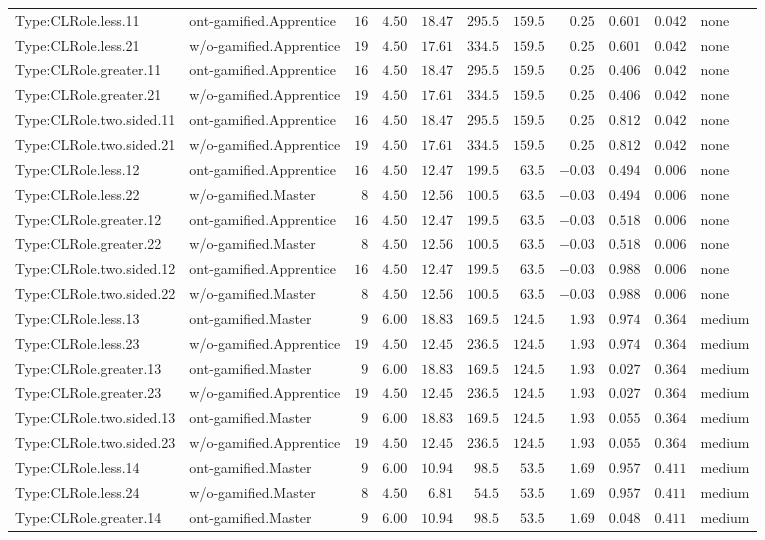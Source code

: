 \documentclass[6pt,a4paper]{article}
\begin{document}
{\begin{longtable}{llrrrrrrrrl}
Type:CLRole.less.11&ont-gamified.Apprentice&$16$&$4.50$&$18.47$&$295.5$&$159.5$&$ 0.25$&$0.601$&$0.042$&none\tabularnewline
Type:CLRole.less.21&w/o-gamified.Apprentice&$19$&$4.50$&$17.61$&$334.5$&$159.5$&$ 0.25$&$0.601$&$0.042$&none\tabularnewline
Type:CLRole.greater.11&ont-gamified.Apprentice&$16$&$4.50$&$18.47$&$295.5$&$159.5$&$ 0.25$&$0.406$&$0.042$&none\tabularnewline
Type:CLRole.greater.21&w/o-gamified.Apprentice&$19$&$4.50$&$17.61$&$334.5$&$159.5$&$ 0.25$&$0.406$&$0.042$&none\tabularnewline
Type:CLRole.two.sided.11&ont-gamified.Apprentice&$16$&$4.50$&$18.47$&$295.5$&$159.5$&$ 0.25$&$0.812$&$0.042$&none\tabularnewline
Type:CLRole.two.sided.21&w/o-gamified.Apprentice&$19$&$4.50$&$17.61$&$334.5$&$159.5$&$ 0.25$&$0.812$&$0.042$&none\tabularnewline
Type:CLRole.less.12&ont-gamified.Apprentice&$16$&$4.50$&$12.47$&$199.5$&$ 63.5$&$-0.03$&$0.494$&$0.006$&none\tabularnewline
Type:CLRole.less.22&w/o-gamified.Master&$ 8$&$4.50$&$12.56$&$100.5$&$ 63.5$&$-0.03$&$0.494$&$0.006$&none\tabularnewline
Type:CLRole.greater.12&ont-gamified.Apprentice&$16$&$4.50$&$12.47$&$199.5$&$ 63.5$&$-0.03$&$0.518$&$0.006$&none\tabularnewline
Type:CLRole.greater.22&w/o-gamified.Master&$ 8$&$4.50$&$12.56$&$100.5$&$ 63.5$&$-0.03$&$0.518$&$0.006$&none\tabularnewline
Type:CLRole.two.sided.12&ont-gamified.Apprentice&$16$&$4.50$&$12.47$&$199.5$&$ 63.5$&$-0.03$&$0.988$&$0.006$&none\tabularnewline
Type:CLRole.two.sided.22&w/o-gamified.Master&$ 8$&$4.50$&$12.56$&$100.5$&$ 63.5$&$-0.03$&$0.988$&$0.006$&none\tabularnewline
Type:CLRole.less.13&ont-gamified.Master&$ 9$&$6.00$&$18.83$&$169.5$&$124.5$&$ 1.93$&$0.974$&$0.364$&medium\tabularnewline
Type:CLRole.less.23&w/o-gamified.Apprentice&$19$&$4.50$&$12.45$&$236.5$&$124.5$&$ 1.93$&$0.974$&$0.364$&medium\tabularnewline
Type:CLRole.greater.13&ont-gamified.Master&$ 9$&$6.00$&$18.83$&$169.5$&$124.5$&$ 1.93$&$0.027$&$0.364$&medium\tabularnewline
Type:CLRole.greater.23&w/o-gamified.Apprentice&$19$&$4.50$&$12.45$&$236.5$&$124.5$&$ 1.93$&$0.027$&$0.364$&medium\tabularnewline
Type:CLRole.two.sided.13&ont-gamified.Master&$ 9$&$6.00$&$18.83$&$169.5$&$124.5$&$ 1.93$&$0.055$&$0.364$&medium\tabularnewline
Type:CLRole.two.sided.23&w/o-gamified.Apprentice&$19$&$4.50$&$12.45$&$236.5$&$124.5$&$ 1.93$&$0.055$&$0.364$&medium\tabularnewline
Type:CLRole.less.14&ont-gamified.Master&$ 9$&$6.00$&$10.94$&$ 98.5$&$ 53.5$&$ 1.69$&$0.957$&$0.411$&medium\tabularnewline
Type:CLRole.less.24&w/o-gamified.Master&$ 8$&$4.50$&$ 6.81$&$ 54.5$&$ 53.5$&$ 1.69$&$0.957$&$0.411$&medium\tabularnewline
Type:CLRole.greater.14&ont-gamified.Master&$ 9$&$6.00$&$10.94$&$ 98.5$&$ 53.5$&$ 1.69$&$0.048$&$0.411$&medium\tabularnewline

\end{longtable}}
\end{document}
